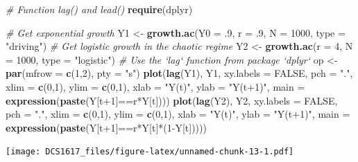 \documentclass[]{book}
\newenvironment{Shaded}{\begin{snugshade}}{\end{snugshade}}
\newcommand{\KeywordTok}[1]{\textcolor[rgb]{0.13,0.29,0.53}{\textbf{{#1}}}}
\newcommand{\DataTypeTok}[1]{\textcolor[rgb]{0.13,0.29,0.53}{{#1}}}
\newcommand{\DecValTok}[1]{\textcolor[rgb]{0.00,0.00,0.81}{{#1}}}
\newcommand{\StringTok}[1]{\textcolor[rgb]{0.31,0.60,0.02}{{#1}}}
\newcommand{\CommentTok}[1]{\textcolor[rgb]{0.56,0.35,0.01}{\textit{{#1}}}}
\newcommand{\OtherTok}[1]{\textcolor[rgb]{0.56,0.35,0.01}{{#1}}}
\newcommand{\NormalTok}[1]{{#1}}
\begin{document}
\begin{Shaded}
\begin{Highlighting}[]
\CommentTok{# Function lag() and lead()}
\KeywordTok{require}\NormalTok{(dplyr)}

\CommentTok{# Get exponential growth}
\NormalTok{Y1 <-}\StringTok{ }\KeywordTok{growth.ac}\NormalTok{(}\DataTypeTok{Y0 =} \NormalTok{.}\DecValTok{9}\NormalTok{, }\DataTypeTok{r =} \NormalTok{.}\DecValTok{9}\NormalTok{, }\DataTypeTok{N =} \DecValTok{1000}\NormalTok{, }\DataTypeTok{type =} \StringTok{"driving"}\NormalTok{)}
\CommentTok{# Get logistic growth in the chaotic regime}
\NormalTok{Y2 <-}\StringTok{ }\KeywordTok{growth.ac}\NormalTok{(}\DataTypeTok{r =} \DecValTok{4}\NormalTok{, }\DataTypeTok{N =} \DecValTok{1000}\NormalTok{, }\DataTypeTok{type =} \StringTok{"logistic"}\NormalTok{)}
\CommentTok{# Use the `lag` function from package `dplyr`}
\NormalTok{op <-}\StringTok{ }\KeywordTok{par}\NormalTok{(}\DataTypeTok{mfrow =} \KeywordTok{c}\NormalTok{(}\DecValTok{1}\NormalTok{,}\DecValTok{2}\NormalTok{), }\DataTypeTok{pty =} \StringTok{"s"}\NormalTok{)}
\KeywordTok{plot}\NormalTok{(}\KeywordTok{lag}\NormalTok{(Y1), Y1, }\DataTypeTok{xy.labels =} \OtherTok{FALSE}\NormalTok{, }\DataTypeTok{pch =} \StringTok{"."}\NormalTok{, }\DataTypeTok{xlim =} \KeywordTok{c}\NormalTok{(}\DecValTok{0}\NormalTok{,}\DecValTok{1}\NormalTok{), }\DataTypeTok{ylim =} \KeywordTok{c}\NormalTok{(}\DecValTok{0}\NormalTok{,}\DecValTok{1}\NormalTok{), }\DataTypeTok{xlab =} \StringTok{"Y(t)"}\NormalTok{, }\DataTypeTok{ylab =} \StringTok{"Y(t+1)"}\NormalTok{,}
     \DataTypeTok{main =} \KeywordTok{expression}\NormalTok{(}\KeywordTok{paste}\NormalTok{(Y[t}\DecValTok{+1}\NormalTok{]==r*Y[t])))}
\KeywordTok{plot}\NormalTok{(}\KeywordTok{lag}\NormalTok{(Y2), Y2, }\DataTypeTok{xy.labels =} \OtherTok{FALSE}\NormalTok{, }\DataTypeTok{pch =} \StringTok{"."}\NormalTok{, }\DataTypeTok{xlim =} \KeywordTok{c}\NormalTok{(}\DecValTok{0}\NormalTok{,}\DecValTok{1}\NormalTok{), }\DataTypeTok{ylim =} \KeywordTok{c}\NormalTok{(}\DecValTok{0}\NormalTok{,}\DecValTok{1}\NormalTok{), }\DataTypeTok{xlab =} \StringTok{"Y(t)"}\NormalTok{, }\DataTypeTok{ylab =} \StringTok{"Y(t+1)"}\NormalTok{,}
     \DataTypeTok{main =} \KeywordTok{expression}\NormalTok{(}\KeywordTok{paste}\NormalTok{(Y[t}\DecValTok{+1}\NormalTok{]==r*Y[t]*(}\DecValTok{1}\NormalTok{-Y[t]))))}
\end{Highlighting}
\end{Shaded}

\texttt{[image: DCS1617\_files/figure-latex/unnamed-chunk-13-1.pdf]}
\end{document}
